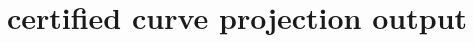\documentclass{article}
\title{certified curve projection output}
\begin{document}
\maketitle





\begin{figure}
    \centering
%    
%    
    

\end{figure}
\end{document}
